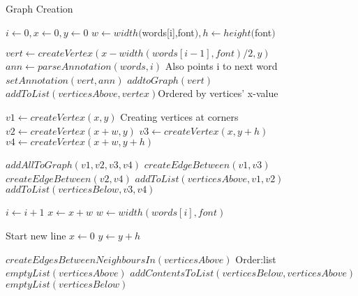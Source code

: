 \documentclass{article}
\begin{document}
\begin{algorithm}
\caption{Graph Creation}\label{euclid}
\begin{algorithmic}[1]
 \State $i \gets 0, x \gets 0, y \gets 0$
 \State $w \gets width($words[i],font$), h \gets height($font$)$
 \item[]
 
   \State $vert \gets createVertex(x-width(words[i-1],font)/2,y)$
   \State $ann \gets parseAnnotation(words,i)$ \Comment Also points i to next word
   \State $setAnnotation(vert,ann)$ 
   \State $addtoGraph(vert)$ 
   \State $addToList(verticesAbove,vertex)$\Comment Ordered by vertices' x-value
   \item[] 
   
  \Else
   \State $v1 \gets createVertex(x,y)$ \Comment Creating vertices at corners
   \State $v2 \gets createVertex(x+w,y)$
   \State $v3 \gets createVertex(x,y+h)$
   \State $v4 \gets createVertex(x+w,y+h)$
   \item[]
   
   \State $addAllToGraph(v1,v2,v3,v4)$
   \State $createEdgeBetween(v1,v3)$
   \State $createEdgeBetween(v2,v4)$
   \State $addToList(verticesAbove,v1,v2)$
   \State $addToList(verticesBelow,v3,v4)$
   \item[]
   
  \EndIf
  \State $i \gets i+1$
  \State $x \gets x+w$
  \State $w \gets width(words[i],font)$
  \item[]
  
   \Comment Start new line
    \State $x \gets 0$
    \State $y \gets y+h$
    \item[]
    
    \State $createEdgesBetweenNeighboursIn(verticesAbove)$ \Comment Order:list
    \State $emptyList(verticesAbove)$
    \State $addContentsToList(verticesBelow, verticesAbove)$ 
    \State $emptyList(verticesBelow)$
  \EndIf
 \EndWhile
\EndProcedure
\end{algorithmic}
\end{algorithm}
\end{document}
